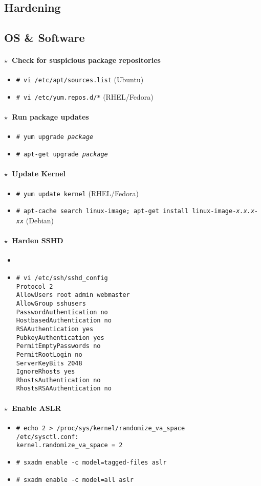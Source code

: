 \documentclass[10pt,landscape]{article}
\newcommand{\os}[1]{\texttt{\footnotesize{#1}}}
\newcommand{\unix}{\os{U}}
\newcommand{\linux}{\os{L}}
\newcommand{\solaris}{\os{S}}
\newenvironment{action}[1]
  {\paragraph{$\star$~#1}\begin{itemize}[leftmargin=1cm]}
  {\end{itemize}}
\newcommand{\cmd}[2]{\item[#1] {\small\tt\# #2}}
\newcommand{\comment}[1]{\textrm{\small(#1)}}
\newcommand{\tool}[2]{\item[#1] {\footnotesize\sc{#2}}\xspace}
\begin{document}
\begin{multicols*}{3}
\section*{Hardening}

\subsection*{OS \& Software}

\begin{action}{Check for suspicious package repositories}
\cmd{\linux}{vi /etc/apt/sources.list} \comment{Ubuntu}
\cmd{\linux}{vi /etc/yum.repos.d/*} \comment{RHEL/Fedora}
\end{action}

\begin{action}{Run package updates}
\cmd{\linux}{yum upgrade \emph{package}}
\cmd{\linux}{apt-get upgrade \emph{package}}
\end{action}

\begin{action}{Update Kernel}
\cmd{\linux}{yum update kernel} \comment{RHEL/Fedora}
\cmd{\linux}{apt-cache search linux-image; apt-get install
  linux-image-\emph{x.x.x-xx}} \comment{Debian}
\end{action}

\begin{action}{Harden SSHD}
\tool{\unix}{fail2ban}
\cmd{\unix}{vi /etc/ssh/sshd\_config\\
  Protocol 2\\
  AllowUsers root admin webmaster\\
  AllowGroup sshusers\\
  PasswordAuthentication no\\
  HostbasedAuthentication no\\
  RSAAuthentication yes\\
  PubkeyAuthentication yes\\
  PermitEmptyPasswords no\\
  PermitRootLogin no\\
  ServerKeyBits 2048\\
  IgnoreRhosts yes\\
  RhostsAuthentication no\\
  RhostsRSAAuthentication no}
\end{action}

\begin{action}{Enable ASLR}
\cmd{\linux}{echo 2 > /proc/sys/kernel/randomize\_va\_space\\
             /etc/sysctl.conf:\\kernel.randomize\_va\_space = 2}
\cmd{\solaris}{sxadm enable -c model=tagged-files aslr}
\cmd{\solaris}{sxadm enable -c model=all aslr}
\end{action}


\end{multicols*}
\end{document}
